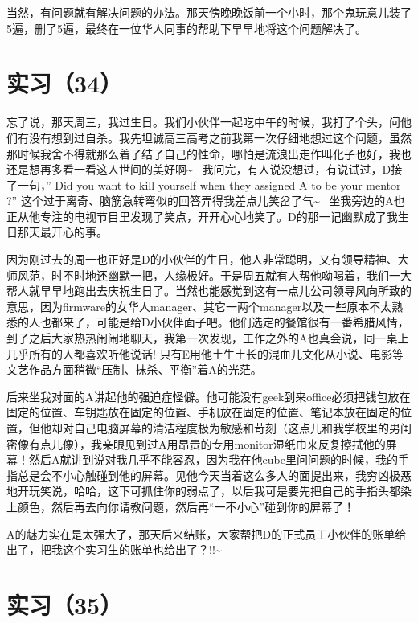 \documentclass[12pt]{book}
\begin{document}
当然，有问题就有解决问题的办法。那天傍晚晚饭前一个小时，那个鬼玩意儿装了5遍，删了5遍，最终在一位华人同事的帮助下早早地将这个问题解决了。


\section{实习（34）}
\label{sec-5-37}

忘了说，那天周三，我过生日。我们小伙伴一起吃中午的时候，我打了个头，问他们有没有想到过自杀。我先坦诚高三高考之前我第一次仔细地想过这个问题，虽然那时候我舍不得就那么着了结了自己的性命，哪怕是流浪出走作叫化子也好，我也还是想再多看一看这人世间的美好啊\textasciitilde{}~ 我问完，有人说没想过，有说试过，D接了一句，” Did you want to kill yourself when they assigned A to be your mentor ?” 这个过于离奇、脑筋急转弯似的回答弄得我差点儿笑岔了气\textasciitilde{}~ 坐我旁边的A也正从他专注的电视节目里发现了笑点，开开心心地笑了。D的那一记幽默成了我生日那天最开心的事。

因为刚过去的周一也正好是D的小伙伴的生日，他人非常聪明，又有领导精神、大师风范，时不时地还幽默一把，人缘极好。于是周五就有人帮他呦喝着，我们一大帮人就早早地跑出去庆祝生日了。当然也能感觉到这有一点儿公司领导风向所致的意思，因为firmware的女华人manager、其它一两个manager以及一些原本不太熟悉的人也都来了，可能是给D小伙伴面子吧。他们选定的餐馆很有一番希腊风情，到了之后大家热热闹闹地聊天，我第一次发现，工作之外的A也真会说，同一桌上几乎所有的人都喜欢听他说话! 只有E用他土生土长的混血儿文化从小说、电影等文艺作品方面稍微“压制、抹杀、平衡”着A的光茫。

后来坐我对面的A讲起他的强迫症怪僻。他可能没有geek到来office必须把钱包放在固定的位置、车钥匙放在固定的位置、手机放在固定的位置、笔记本放在固定的位置，但他却对自己电脑屏幕的清洁程度极为敏感和苛刻（这点儿和我学校里的男闺密像有点儿像），我亲眼见到过A用昂贵的专用monitor湿纸巾来反复擦拭他的屏幕！然后A就讲到说对我几乎不能容忍，因为我在他cube里问问题的时候，我的手指总是会不小心触碰到他的屏幕。见他今天当着这么多人的面提出来，我穷凶极恶地开玩笑说，哈哈，这下可抓住你的弱点了，以后我可是要先把自己的手指头都染上颜色，然后再去向你请教问题，然后再“一不小心”碰到你的屏幕了！

A的魅力实在是太强大了，那天后来结账，大家帮把D的正式员工小伙伴的账单给出了，把我这个实习生的账单也给出了？!!\textasciitilde{}~


\section{实习（35）}
\label{sec-5-38}
\end{document}
